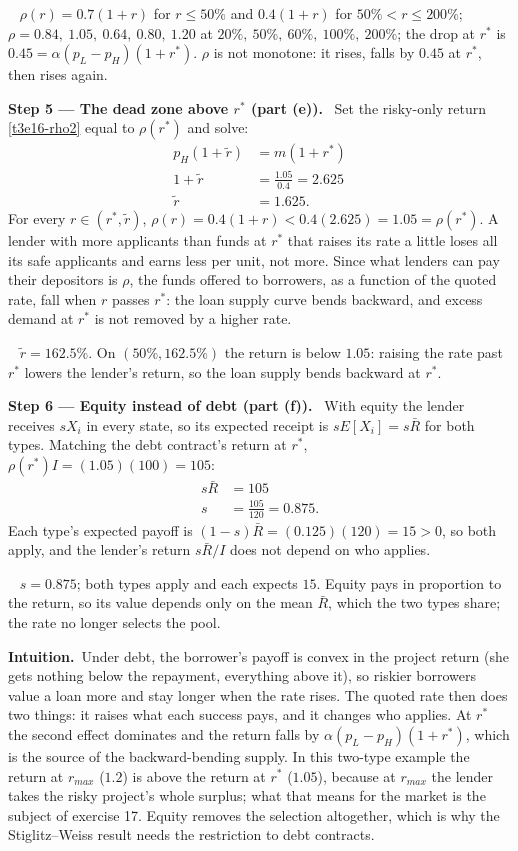 \documentclass[11pt,a4paper]{article}
\newcommand{\step}[2]{\par\medskip\noindent\textbf{Step #1 --- #2.}~}
\newcommand{\intuition}{\par\medskip\noindent\textbf{Intuition.}~}
\newcommand{\answer}[1]{\par\smallskip\noindent\fbox{\textbf{Answer #1.}}~}
\begin{document}
\answer{(d)} $\rho(r)=0.7(1+r)$ for $r\le50\%$ and $0.4(1+r)$ for $50\%<r\le200\%$; $\rho=0.84,\ 1.05,\ 0.64,\ 0.80,\ 1.20$ at $20\%,\ 50\%,\ 60\%,\ 100\%,\ 200\%$; the drop at $r^*$ is $0.45=\alpha(p_L-p_H)(1+r^*)$. $\rho$ is not monotone: it rises, falls by $0.45$ at $r^*$, then rises again.

\step{5}{The dead zone above $r^*$ (part (e))} Set the risky-only return \eqref{t3e16-rho2} equal to $\rho(r^*)$ and solve:
\begin{align}
  p_H(1+\tilde r) &= m(1+r^*) \nonumber\\
  1+\tilde r &= \frac{1.05}{0.4} = 2.625 \nonumber\\
  \tilde r &= 1.625. \label{t3e16-rtilde}
\end{align}
For every $r\in(r^*,\tilde r)$, $\rho(r)=0.4(1+r)<0.4(2.625)=1.05=\rho(r^*)$. A lender with more applicants than funds at $r^*$ that raises its rate a little loses all its safe applicants and earns less per unit, not more. Since what lenders can pay their depositors is $\rho$, the funds offered to borrowers, as a function of the quoted rate, fall when $r$ passes $r^*$: the loan supply curve bends backward, and excess demand at $r^*$ is not removed by a higher rate.

\answer{(e)} $\tilde r=162.5\%$. On $(50\%,162.5\%)$ the return is below $1.05$: raising the rate past $r^*$ lowers the lender's return, so the loan supply bends backward at $r^*$.

\step{6}{Equity instead of debt (part (f))} With equity the lender receives $sX_i$ in every state, so its expected receipt is $sE[X_i]=s\bar R$ for both types. Matching the debt contract's return at $r^*$, $\rho(r^*)I=(1.05)(100)=105$:
\begin{align}
  s\bar R &= 105 \nonumber\\
  s &= \frac{105}{120} = 0.875. \label{t3e16-s}
\end{align}
Each type's expected payoff is $(1-s)\bar R=(0.125)(120)=15>0$, so both apply, and the lender's return $s\bar R/I$ does not depend on who applies.

\answer{(f)} $s=0.875$; both types apply and each expects $15$. Equity pays in proportion to the return, so its value depends only on the mean $\bar R$, which the two types share; the rate no longer selects the pool.

\intuition Under debt, the borrower's payoff is convex in the project return (she gets nothing below the repayment, everything above it), so riskier borrowers value a loan more and stay longer when the rate rises. The quoted rate then does two things: it raises what each success pays, and it changes who applies. At $r^*$ the second effect dominates and the return falls by $\alpha(p_L-p_H)(1+r^*)$, which is the source of the backward-bending supply. In this two-type example the return at $r_{max}$ ($1.2$) is above the return at $r^*$ ($1.05$), because at $r_{max}$ the lender takes the risky project's whole surplus; what that means for the market is the subject of exercise 17. Equity removes the selection altogether, which is why the Stiglitz--Weiss result needs the restriction to debt contracts.
\end{document}
